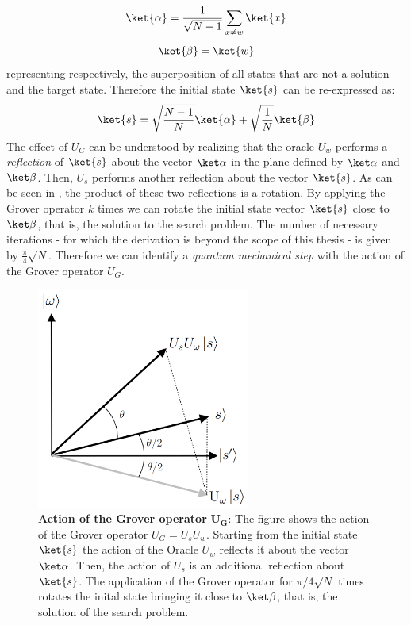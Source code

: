 \begin{equation}
    \ket{\alpha} = \frac{1}{\sqrt{N-1}}\sum_{x\neq w}\ket{x}
\end{equation}
\vspace{-0.5cm}
\begin{equation}
  \ket{\beta} = \ket{w}
\end{equation}
representing respectively, the superposition of all states that are not a solution and the target state. Therefore the initial state $\ket{s}$ can be re-expressed as:
\begin{equation}
  \ket{s}= \sqrt{\frac{N-1}{N}}\ket{\alpha} + \sqrt{\frac{1}{N}}\ket{\beta}
\end{equation}
The effect of $U_G$ can be understood by realizing that the oracle $U_w$ performs a \textit{reflection} of $\ket{s}$ about the vector $\kalpha$ in the plane defined by $\kalpha$ and $\kbeta$. Then, $U_s$ performs another reflection about the vector $\ket{s}$. As can be seen in , the product of these two reflections is a rotation. By applying the Grover operator $k$ times we can rotate the initial state vector $\ket{s}$ close to $\kbeta$, that is, the solution to the search problem. The number of necessary iterations - for which the derivation is beyond the scope of this thesis - is given by $\frac{\pi}{4}\sqrt{N}$. Therefore we can identify a \textit{quantum mechanical step} with the action of the Grover operator $U_G$.
\begin{figure}[ht]
  \centering
  \includegraphics[width=70mm]{figures/chapter1/grover_reflection}
  \caption[Action of the Grover operator]{\textbf{Action of the Grover operator }$\bm{U_G}$: The figure shows the action of the Grover operator $U_G=U_s U_w$. Starting from the initial state $\ket{s}$ the action of the Oracle $U_w$ reflects it about the vector $\kalpha$. Then, the action of $U_s$ is an additional reflection about $\ket{s}$. The application of the Grover operator for $\pi/4\sqrt{N}$ times rotates the inital state bringing it close to $\kbeta$, that is, the solution of the search problem.}
  \label{fig:grover_operator}
\end{figure}


